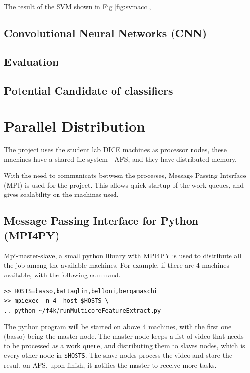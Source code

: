 \documentclass[bsc,logo,twoside,fullspacing,parskip]{infthesis}
\begin{document}
The result of the SVM shown in Fig \ref{fig:svmacc}, 

\section{Convolutional Neural Networks (CNN)}
\label{sec:cnn}



\section{Evaluation}
\section{Potential Candidate of classifiers}

\chapter{Parallel Distribution}

The project uses the student lab DICE machines as processor nodes, these machines have a shared file-system - AFS, and they have distributed memory. 

With the need to communicate between the processes, Message Passing Interface (MPI) is used for the project. This allows quick startup of the work queues, and gives scalability on the machines used.

\section{Message Passing Interface for Python (MPI4PY)}

Mpi-master-slave, a small python library with MPI4PY is used to distribute all the job among the available machines. 
For example, if there are 4 machines available, with the following command: 
\lstset{basicstyle=\footnotesize\ttfamily,breaklines=true}
\begin{lstlisting}[frame=single]
>> HOSTS=basso,battaglin,belloni,bergamaschi
>> mpiexec -n 4 -host $HOSTS \
.. python ~/f4k/runMulticoreFeatureExtract.py
\end{lstlisting}
The python program will be started on above 4 machines, with the first one (basso) being the master node.
The master node keeps a list of video that needs to be processed as a work queue, and distributing them to slaves nodes, which is every other node in {\tt \$HOSTS}. 
The slave nodes process the video and store the result on AFS, upon finish, it notifies the master to receive more tasks.
\end{document}
